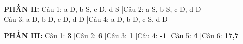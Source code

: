 \documentclass[11pt,a4paper]{article}
\begin{document}
\vspace{0.1cm}
\noindent
\textbf{\color{mainGreen}PHẦN II:} Câu 1: a-Đ, b-S, c-Đ, d-S \quad|\quad Câu 2: a-S, b-S, c-Đ, d-Đ\\
Câu 3: a-Đ, b-Đ, c-Đ, d-Đ \quad|\quad Câu 4: a-Đ, b-Đ, c-S, d-Đ

\vspace{0.1cm}
\noindent
\textbf{\color{mainGreen}PHẦN III:} Câu 1: \textbf{3} \quad|\quad Câu 2: \textbf{6} \quad|\quad Câu 3: \textbf{1} \quad|\quad Câu 4: \textbf{-1} \quad|\quad Câu 5: \textbf{4} \quad|\quad Câu 6: \textbf{17,7}

\end{document}
